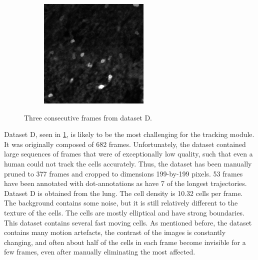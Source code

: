 \begin{figure}[h]
\begin{subfigure}{.32\textwidth}
		\end{subfigure}
		\hfill
		\begin{subfigure}{.32\textwidth}
		\includegraphics[width=\textwidth]{images/series14croppedclean027}
		\end{subfigure}
		\caption{Three consecutive frames from dataset D.}
		\label{fig:data_datasetD}
	\end{figure}

 	Dataset D, seen in \cref{fig:data_datasetD}, is likely to be the most challenging for the tracking module. It was originally composed of 682 frames. Unfortunately, the dataset contained large sequences of frames that were of exceptionally low quality, such that even a human could not track the cells accurately. Thus, the dataset has been manually pruned to 377 frames and cropped to dimensions 199-by-199 pixels. 53 frames have been annotated with dot-annotations as have 7 of the longest trajectories. Dataset D is obtained from the lung. The cell density is 10.32 cells per frame. The background contains some noise, but it is still relatively different to the texture of the cells. The cells are mostly elliptical and have strong boundaries. This dataset contains several fast moving cells. As mentioned before, the dataset contains many motion artefacts, the contrast of the images is constantly changing, and often about half of the cells in each frame become invisible for a few frames, even after manually eliminating the most affected.
	
